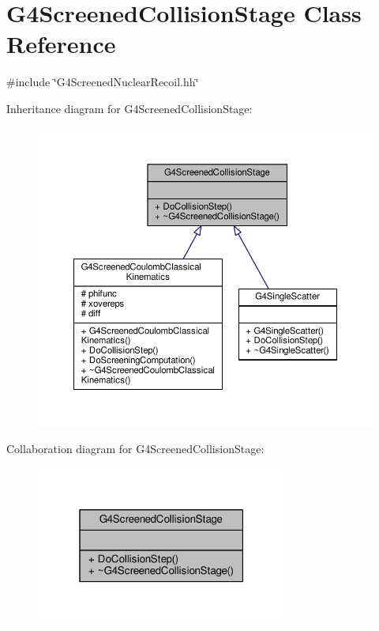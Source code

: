 \hypertarget{classG4ScreenedCollisionStage}{}\section{G4\+Screened\+Collision\+Stage Class Reference}
\label{classG4ScreenedCollisionStage}


{\ttfamily \#include \char`\"{}G4\+Screened\+Nuclear\+Recoil.\+hh\char`\"{}}



Inheritance diagram for G4\+Screened\+Collision\+Stage\+:
\nopagebreak
\begin{figure}[H]
\begin{center}
\leavevmode
\includegraphics[width=350pt]{classG4ScreenedCollisionStage__inherit__graph}
\end{center}
\end{figure}


Collaboration diagram for G4\+Screened\+Collision\+Stage\+:
\nopagebreak
\begin{figure}[H]
\begin{center}
\leavevmode
\includegraphics[width=235pt]{classG4ScreenedCollisionStage__coll__graph}
\end{center}
\end{figure}
